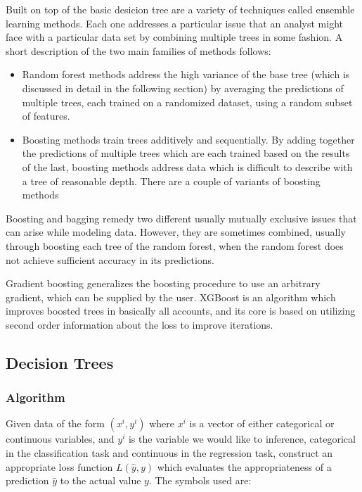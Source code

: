 \documentclass[a4paper, 11pt]{article}
\begin{document}
Built on top of the basic desicion tree are a variety of techniques
called ensemble learning methods. Each one addresses a particular
issue that an analyst might face with a particular data set by
combining multiple trees in some fashion. A short description of the
two main families of methods follows:
\begin{itemize}
  \item Random forest methods
    address the high variance of the base tree (which is discussed in
    detail in the following section) by averaging the predictions of
    multiple trees, each trained on a randomized dataset, using a random
    subset of features.
  \item Boosting methods train trees additively and sequentially. By
    adding together the predictions of multiple trees which are each
    trained based on the results of the last, boosting methods
    address data which is difficult to describe with a tree of
    reasonable depth. There are a couple of variants of boosting methods
\end{itemize}

Boosting and bagging remedy two different usually mutually
exclusive issues that can arise while modeling data. However, they are
sometimes combined, usually through boosting each tree of the random
forest, when the random forest does not achieve sufficient accuracy
in its predictions.

Gradient boosting generalizes the boosting procedure to use an
arbitrary gradient, which can be supplied by the user. XGBoost is an
algorithm which improves boosted trees in basically all accounts, and
its core is based on utilizing second order information about the
loss to improve iterations.

\subsection{Decision Trees}

\subsubsection{Algorithm}

Given data of the form $(x^i, y^i)$ where $x^i$ is a vector of either
categorical or continuous variables, and $y^i$ is the variable we
would like to inference, categorical in the classification task and
continuous in the regression task, construct an appropriate loss
function $L(\hat y, y)$ which evaluates the appropriateness of a
prediction $\hat y$ to the actual value $y$. The symbols used are:
\end{document}
